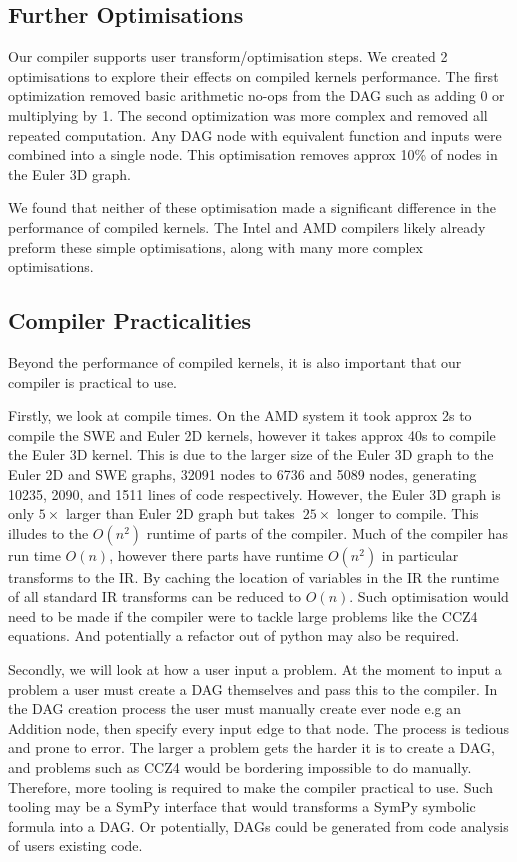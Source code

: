 \subsection{Further Optimisations}

Our compiler supports user transform/optimisation steps.
We created 2 optimisations to explore their effects on compiled kernels performance.
The first optimization removed basic arithmetic no-ops from the DAG such as adding 0 or multiplying by 1.
The second optimization was more complex and removed all repeated computation.
Any DAG node with equivalent function and inputs were combined into a single node.
This optimisation removes approx 10\% of nodes in the Euler 3D graph.

We found that neither of these optimisation made a significant difference in the performance of compiled kernels.
The Intel and AMD compilers likely already preform these simple optimisations, along with many more complex optimisations.

\subsection{Compiler Practicalities} \label{sec:practical}
Beyond the performance of compiled kernels, it is also important that our compiler is practical to use.

Firstly, we look at compile times.
On the AMD system it took approx 2s to compile the SWE and Euler 2D kernels, however it takes approx 40s to compile the Euler 3D kernel.
This is due to the larger size of the Euler 3D graph to the Euler 2D and SWE graphs, 32091 nodes to 6736 and 5089 nodes, generating 10235, 2090, and 1511 lines of code respectively.
However, the Euler 3D graph is only $5\times$ larger than Euler 2D graph but takes $~25\times$ longer to compile.
This illudes to the $O(n^2)$ runtime of parts of the compiler.
Much of the compiler has run time $O(n)$, however there parts have runtime $O(n^2)$ in particular transforms to the IR.
By caching the location of variables in the IR the runtime of all standard IR transforms can be reduced to $O(n)$.
Such optimisation would need to be made if the compiler were to tackle large problems like the CCZ4 equations.
And potentially a refactor out of python may also be required.

Secondly, we will look at how a user input a problem.
At the moment to input a problem a user must create a DAG themselves and pass this to the compiler.
In the DAG creation process the user must manually create ever node e.g an Addition node, then specify every input edge to that node.
The process is tedious and prone to error.
The larger a problem gets the harder it is to create a DAG, and problems such as CCZ4 would be bordering impossible to do manually.
Therefore, more tooling is required to make the compiler practical to use.
Such tooling may be a SymPy interface that would transforms a SymPy symbolic formula into a DAG.
Or potentially, DAGs could be generated from code analysis of users existing code.  